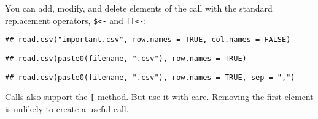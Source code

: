 You can add, modify, and delete elements of the call with the standard
replacement operators, \texttt{\$\textless{}-} and
\texttt{{[}{[}\textless{}-}: 

\begin{Shaded}
\begin{Highlighting}[]
\StringTok{ }\NormalTok{(}\NormalTok{(}\NormalTok{, } \NormalTok{))}
\OperatorTok{$}\StringTok{ }
\OperatorTok{$}\StringTok{ }
\end{Highlighting}
\end{Shaded}

\begin{verbatim}
## read.csv("important.csv", row.names = TRUE, col.names = FALSE)
\end{verbatim}

\begin{Shaded}
\begin{Highlighting}[]
\NormalTok{y[[}\NormalTok{]] <-}\StringTok{ }\NormalTok{(}\NormalTok{))}
\NormalTok{y[[}\NormalTok{]] <-}\StringTok{ }
\end{Highlighting}
\end{Shaded}

\begin{verbatim}
## read.csv(paste0(filename, ".csv"), row.names = TRUE)
\end{verbatim}

\begin{Shaded}
\begin{Highlighting}[]
\OperatorTok{$}
\end{Highlighting}
\end{Shaded}

\begin{verbatim}
## read.csv(paste0(filename, ".csv"), row.names = TRUE, sep = ",")
\end{verbatim}

Calls also support the \texttt{{[}} method. But use it with care.
Removing the first element is unlikely to create a useful call.

\begin{Shaded}
\begin{Highlighting}[]
\NormalTok{x[}\OperatorTok{-}\NormalTok{] }
\end{Highlighting}
\end{Shaded}

